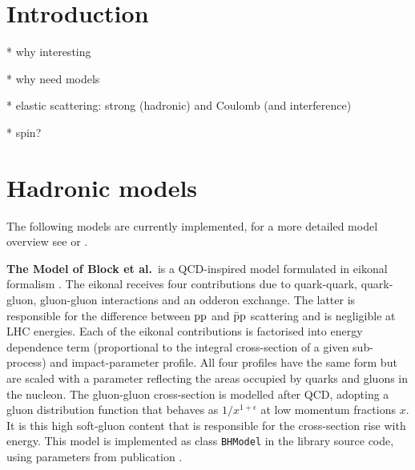 \documentclass[preprint,12pt]{elsarticle}
\def\class#1{{\tt #1}}
\begin{document}
\newpage


\section{Introduction}\label{s:inc}

* why interesting

* why need models

* elastic scattering: strong (hadronic) and Coulomb (and interference)

* spin?



\section{Hadronic models}\label{s:had mod}

The following models are currently implemented, for a more detailed model overview see \cite[section 1.1]{jan_thesis} or \cite[section 4]{dremin13}.

{\bf The Model of Block et al.}~is a QCD-inspired model formulated in eikonal formalism \cite{bh99,block06}. The eikonal receives four contributions due to quark-quark, quark-gluon, gluon-gluon interactions and an odderon exchange. The latter is responsible for the difference between $\rm pp$ and $\rm \bar p p$ scattering and is negligible at LHC energies. Each of the eikonal contributions is factorised into energy dependence term (proportional to the integral cross-section of a given sub-process) and impact-parameter profile. All four profiles have the same form but are scaled with a parameter reflecting the areas occupied by quarks and gluons in the nucleon. The gluon-gluon cross-section is modelled after QCD, adopting a gluon distribution function that behaves as $1/x^{1+\epsilon}$ at low momentum fractions $x$. It is this high soft-gluon content that is responsible for the cross-section rise with energy. This model is implemented as class \class{BHModel} in the library source code, using parameters from publication \cite{block06}.
\end{document}
